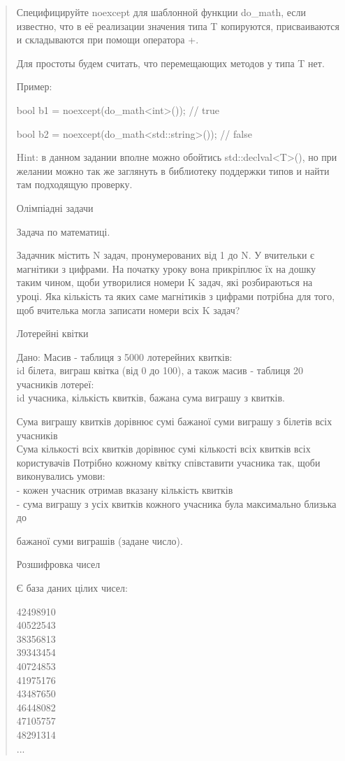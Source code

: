 \documentclass[]{article}
\begin{document}
\begin{quote}
Специфицируйте noexcept для шаблонной функции do_math, если известно, что в её реализации значения типа T копируются,  присваиваются и складываются при помощи оператора +.

Для простоты будем считать, что перемещающих методов у типа T нет.

Пример:

bool b1 = noexcept(do_math<int>()); // true

bool b2 = noexcept(do_math<std::string>()); // false


Hint: в данном задании вполне можно обойтись std::declval<T>(), но при желании можно так же заглянуть в библиотеку поддержки типов и найти там подходящую проверку.


Олімпіадні задачи

Задача по математиці.

Задачник містить N задач, пронумерованих від 1 до N. У вчительки є
магнітики з цифрами. На початку уроку вона прикріплює їх на дошку таким
чином, щоби утворилися номери K задач, які розбираються на уроці. Яка
кількість та яких саме магнітиків з цифрами потрібна для того, щоб
вчителька могла записати номери всіх K задач?

Лотерейні квітки

Дано: Масив - таблиця з 5000 лотерейних квитків:\\
id білета, виграш квітка (від 0 до 100), а також масив - таблиця 20
учасників лотереї:\\
id учасника, кількість квитків, бажана сума виграшу з квитків.

Сума виграшу квитків дорівнює сумі бажаної суми виграшу з білетів всіх
учасників\\
Сума кількості всіх квитків дорівнює сумі кількості всіх квитків всіх
користувачів Потрібно кожному квітку співставити учасника так, щоби
виконувались умови:\\
- кожен учасник отримав вказану кількість квитків\\
- сума виграшу з усіх квитків кожного учасника була максимально близька
до

бажаної суми виграшів (задане число).

Розшифровка чисел

Є база даних цілих чисел:

42498910\\
40522543\\
38356813\\
39343454\\
40724853\\
41975176\\
43487650\\
46448082\\
47105757\\
48291314\\
...


\end{quote}
\end{document}
